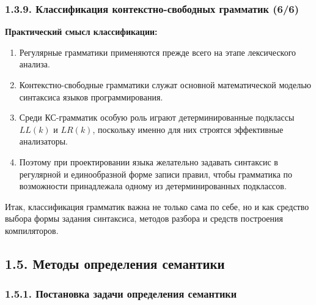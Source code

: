 \documentclass[mathserif,12pt,aspectratio=169]{beamer}
\def\NB#1{{\bf\color{brown}#1}}
\begin{document}
\begin{frame}
\frametitle{1.3.9. Классификация контекстно-свободных грамматик (6/6)}

\NB{Практический смысл классификации:}

\begin{enumerate}
\item Регулярные грамматики применяются прежде всего
на этапе лексического анализа.

\item Контекстно-свободные грамматики служат основной
математической моделью синтаксиса языков программирования.

\item Среди КС-грамматик особую роль играют
детерминированные подклассы $LL(k)$ и $LR(k)$,
поскольку именно для них строятся эффективные анализаторы.

\item Поэтому при проектировании языка желательно задавать
синтаксис в регулярной и единообразной форме записи правил,
чтобы грамматика по возможности принадлежала
одному из детерминированных подклассов.
\end{enumerate}

\begin{digress}
Итак, классификация грамматик важна не только сама по себе,
но и как средство выбора формы задания синтаксиса,
методов разбора и средств построения компиляторов.
\end{digress}

\end{frame}



\subsection{1.5. Методы определения семантики}\label{1.5.}

\subsubsection{1.5.1. Постановка задачи определения семантики}\label{1.5.1.}
\end{document}
